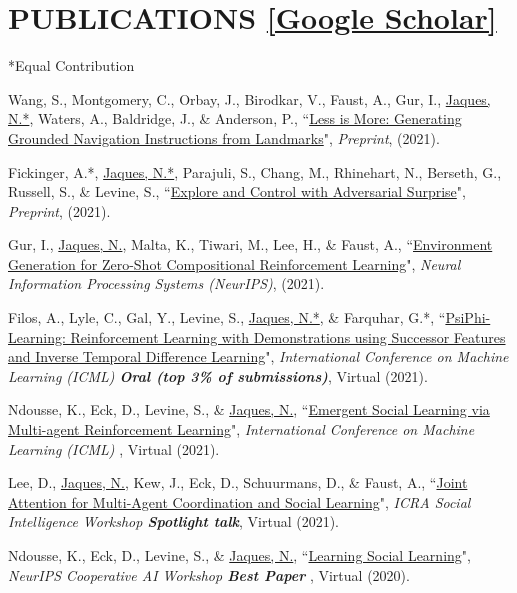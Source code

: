 \documentclass[paper=letter,fontsize=11pt]{scrartcl} %
\newcommand{\NewPart}[2]{\section*{\uppercase{#1} #2}}
\newcommand{\PaperEntry}[6]{
        \noindent #1, ``\href{#6}{#2}", \textit{#3}, #4 (#5).}
\begin{document}

\NewPart{Publications}{\href{https://scholar.google.co.uk/citations?user=8iCb2TwAAAAJ&hl=en}{[Google Scholar]}}
*Equal Contribution
\begin{etaremune}

\item \PaperEntry{Wang, S., Montgomery, C., Orbay, J., Birodkar, V., Faust, A., Gur, I., \underline{Jaques, N.*}, Waters, A., Baldridge, J., \& Anderson, P.}{Less is More: Generating Grounded Navigation Instructions from Landmarks}{Preprint}{}{2021}{https://arxiv.org/abs/2111.12872}

\item \PaperEntry{Fickinger, A.*, \underline{Jaques, N.*}, Parajuli, S., Chang, M., Rhinehart, N., Berseth, G., Russell, S., \& Levine, S.}{Explore and Control with Adversarial Surprise}{Preprint}{}{2021}{https://arxiv.org/abs/2107.07394}

\item \PaperEntry{Gur, I., \underline{Jaques, N.}, Malta, K., Tiwari, M., Lee, H., \& Faust, A.}{Environment Generation for Zero-Shot Compositional Reinforcement Learning}{Neural Information Processing Systems (NeurIPS)}{}{2021}{https://papers.nips.cc/paper/2021/file/218344619d8fb95d504ccfa11804073f-Paper.pdf }

\item \PaperEntry{Filos, A., Lyle, C., Gal, Y., Levine, S., \underline{Jaques, N.*}, \& Farquhar, G.*}{PsiPhi-Learning: Reinforcement Learning with Demonstrations using Successor Features and Inverse Temporal Difference Learning}{International Conference on Machine Learning (ICML) \textbf{Oral (top 3\% of submissions)}}{Virtual}{2021}{https://arxiv.org/pdf/2102.12560.pdf}

\item \PaperEntry{Ndousse, K., Eck, D., Levine, S., \& \underline{Jaques, N.}}{Emergent Social Learning via Multi-agent Reinforcement Learning}{International Conference on Machine Learning (ICML) }{Virtual}{2021}{https://arxiv.org/abs/2010.00581}

\item \PaperEntry{Lee, D., \underline{Jaques, N.}, Kew, J., Eck, D., Schuurmans, D., \& Faust, A.}{Joint Attention for Multi-Agent Coordination and Social Learning}{ICRA Social Intelligence Workshop \textbf{Spotlight talk}}{Virtual}{2021}{https://arxiv.org/abs/2104.07750}

\item \PaperEntry{Ndousse, K., Eck, D., Levine, S., \& \underline{Jaques, N.}}{Learning Social Learning}{NeurIPS Cooperative AI Workshop \textbf{Best Paper} }{Virtual}{2020}{https://arxiv.org/abs/2010.00581}


\end{etaremune}
\end{document}
